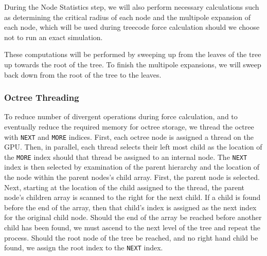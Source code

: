 \documentclass{thesis}
\begin{document}
During the Node Statistics step, we will also perform necessary calculations such as determining the critical radius of each node and the multipole expansion of each node, which will be used during treecode force calculation should we choose not to run an exact simulation.

These computations will be performed by sweeping up from the leaves of the tree up towards the root of the tree. To finish the multipole expansions, we will sweep back down from the root of the tree to the leaves.

\subsubsection{Octree Threading}
To reduce number of divergent operations during force calculation, and to eventually reduce the required memory for octree storage, we thread the octree with \texttt{NEXT} and \texttt{MORE} indices. First, each octree node is assigned a thread on the GPU. Then, in parallel, each thread selects their left most child as the location of the \texttt{MORE} index should that thread be assigned to an internal node. The \texttt{NEXT} index is then selected by examination of the parent hierarchy and the location of the node within the parent nodes's child array. First, the parent node is selected. Next, starting at the location of the child assigned to the thread, the parent node's children array is scanned to the right for the next child. If a child is found before the end of the array, then that child's index is assigned as the next index for the original child node. Should the end of the array be reached before another child has been found, we must ascend to the next level of the tree and repeat the process. Should the root node of the tree be reached, and no right hand child be found, we assign the root index to the \texttt{NEXT} index.
\end{document}
